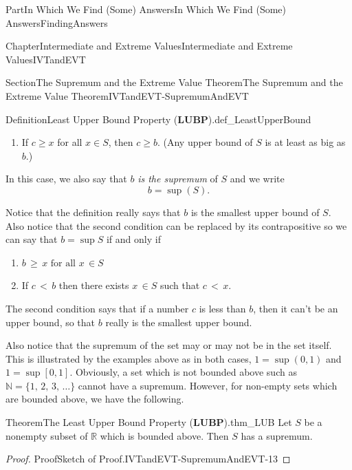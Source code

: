 \documentclass[oneside,10pt,]{book}
\newcommand{\terminology}[1]{\textbf{#1}}
\numberwithin{equation}{part}
\newcommand{\lt}{<}
\begin{document}
\begin{partptx}{Part}{In Which We Find (Some) Answers}{}{In Which We Find (Some) Answers}{}{}{FindingAnswers}
\begin{chapterptx}{Chapter}{Intermediate and Extreme Values}{}{Intermediate and Extreme Values}{}{}{IVTandEVT}
\begin{sectionptx}{Section}{The Supremum and the Extreme Value Theorem}{}{The Supremum and the Extreme Value Theorem}{}{}{IVTandEVT-SupremumAndEVT}
\begin{definition}{Definition}{Least Upper Bound Property (\terminology{LUBP}).}{def_LeastUpperBound}
\begin{enumerate}[label={(\alph*)}]
\item{}If \(c\geq x\) for all \(x\in S\), then \(c\geq b\). (Any upper bound of \(S\) is at least as big as \(b\).)%
\end{enumerate}
%
\par
In this case, we also say that \(b\) \emph{is the supremum} of \(S\) and we write%
\begin{equation*}
b=\sup\left(S\right)\text{.}
\end{equation*}
%
\end{definition}
Notice that the definition really says that \(b\) is the smallest upper bound of \(S\). Also notice that the second condition can be replaced by its contrapositive so we can say that \(b=\sup S\) if and only if%
\begin{enumerate}[label={(\alph*)}]
\item{}\(\displaystyle b\,\geq\,x\text{ for all } x\,\in S\)%
\item{}If \(c\,\lt \,b\) then there exists \(x\,\in S\) such that \(c\,\lt \,x\).%
\end{enumerate}
%
\par
The second condition says that if a number \(c\) is less than \(b\), then it can't be an upper bound, so that \(b\) really is the smallest upper bound.%
\par
Also notice that the supremum of the set may or may not be in the set itself. This is illustrated by the examples above as in both cases, \(1=\sup(0,1)\) and \(1=\sup [0,1]\). Obviously, a set which is not bounded above such as \(\mathbb{N}=\{1,\,2,\,3,\,\ldots\}\) cannot have a supremum. However, for non-empty sets which are bounded above, we have the following.%
\begin{theorem}{Theorem}{The Least Upper Bound Property (\terminology{LUBP}).}{}{thm_LUB}%
%
Let \(S\) be a non\textendash{}empty subset of \(\mathbb{R}\) which is bounded above. Then \(S\) has a supremum.%
\end{theorem}
\begin{proof}{Proof}{Sketch of Proof.}{IVTandEVT-SupremumAndEVT-13}

\end{proof}
\end{sectionptx}
\end{chapterptx}
\end{partptx}
\end{document}
